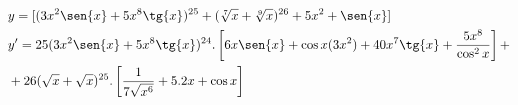 \begin{ex}
\begin{align}
&y=[(3x^2\sen{x}+5x^8\tg{x})^{25}+(\sqrt[7]{x}+\sqrt[9]{x})^{26}+5x^2+\sen{x}]\nonumber\\
&y'=25(3x^2\sen{x}+5x^8\tg{x})^{24}.\left[6x\sen{x}+\cos{x}(3x^2)+40x^7\tg{x}+\frac{5x^8}{\cos^2{x}}\right]+\nonumber\\
&+26(\sqrt{x}+\sqrt{x})^{25}.\left[\frac{1}{7\sqrt{x^6}}+5.2x+\cos{x}\right]\nonumber
\end{align}
\end{ex}